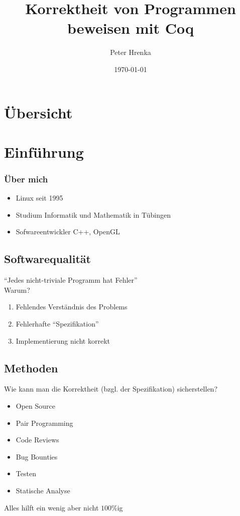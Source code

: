 \documentclass[aspectratio=169]{beamer}
\title{Korrektheit von Programmen beweisen mit Coq}
\institute{Linux Tag Tübingen 2016}
\author{Peter Hrenka}
\date{\today}
\begin{document}
\begin{frame}
\titlepage
\end{frame}
\section*{Übersicht}
\begin{frame}
  \tableofcontents
\end{frame}
\section{Einführung}
\begin{frame}
  \frametitle{Über mich}
  \begin{itemize}
    \item Linux seit 1995
    \item Studium Informatik und Mathematik in Tübingen
    \item Sofwareentwickler C++, OpenGL
  \end{itemize}
\end{frame}
\subsection{Softwarequalität}
\begin{frame}
  ``Jedes nicht-triviale Programm hat Fehler''\\
  \pause
  \vfill
  Warum?
  \pause
  \vfill
  \begin{enumerate}
    \item Fehlendes Verständnis des Problems
    \pause
    \item Fehlerhafte ``Spezifikation''
    \pause
    \item Implementierung nicht korrekt
  \end{enumerate}
\end{frame}
\subsection{Methoden}
\begin{frame}
  Wie kann man die Korrektheit (bzgl. der Spezifikation) sicherstellen?
  \begin{itemize}
  \item Open Source
  \item Pair Programming
  \item Code Reviews
  \item Bug Bounties
  \item Testen
  \item Statische Analyse \pause
  \end{itemize}
  \vfill
  Alles hilft ein wenig aber nicht $100\%$ig 
\end{frame}
\end{document}
